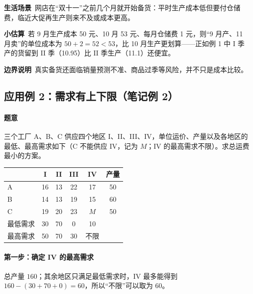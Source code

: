 \begin{lifebox}[电商大促前的提前备货]
\textbf{生活场景}\ 网店在“双十一”之前几个月就开始备货：平时生产成本低但要付仓储费，临近大促再生产则来不及或成本更高。\par
{}
\textbf{小估算}\ 若 9 月生产成本 50 元、10 月 53 元、每月仓储费 1 元，则“9 月产、11 月卖”的单位成本为 $50+2=52<53$，比 10 月生产更划算——正如例 1 中 I 季产的货留到 II 季（10.95）比 II 季生产（11.1）还便宜。\par
\textbf{边界说明}\ 真实备货还面临销量预测不准、商品过季等风险，并不只是成本比较。
\end{lifebox}

\subsection{应用例 2：需求有上下限（笔记例 2）}
\paragraph{题意 \orig}
三个工厂 A、B、C 供应四个地区 I、II、III、IV，单位运价、产量以及各地区的最低、最高需求如下（C 不能供应 IV，记为 $M$；IV 的最高需求不限）。求总运费最小的方案。
\begin{center}\small
\begin{tabular}{@{}lccccc@{}}
\toprule
 & I & II & III & IV & 产量\\
\midrule
A & 16 & 13 & 22 & 17 & 50\\
B & 14 & 13 & 19 & 15 & 60\\
C & 19 & 20 & 23 & $M$ & 50\\
\midrule
最低需求 & 30 & 70 & 0 & 10 & \\
最高需求 & 50 & 70 & 30 & 不限 & \\
\bottomrule
\end{tabular}
\end{center}

\paragraph{第一步：确定 IV 的最高需求}
总产量 $160$；其余地区只满足最低需求时，IV 最多能得到 $160-(30+70+0)=60$，所以“不限”可以取为 60。

